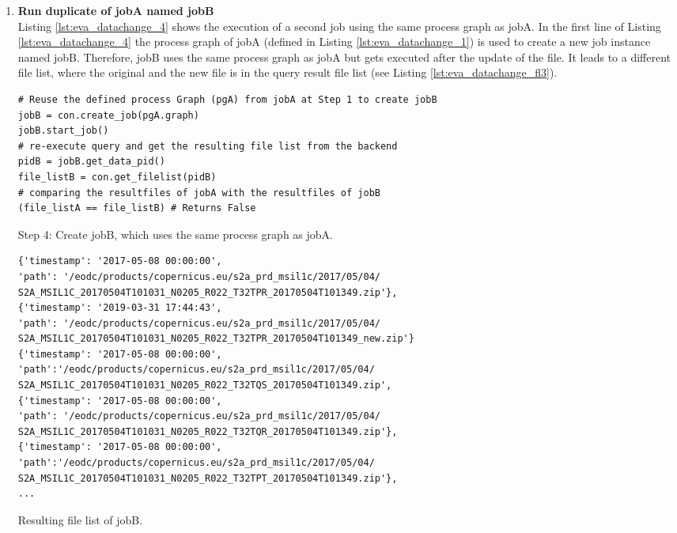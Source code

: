 \documentclass[draft,final]{vutinfth} %
\newenvironment{code}{\captionsetup{type=listing}}{}
\begin{document}
\begin{enumerate}
	\item \textbf{Run duplicate of jobA named jobB} \\
	Listing \ref{lst:eva_datachange_4} shows the execution of a second job using the same process graph as jobA. In the first line of Listing \ref{lst:eva_datachange_4} the process graph of jobA (defined in Listing \ref{lst:eva_datachange_1}) is used to create a new job instance named jobB. Therefore, jobB uses the same process graph as jobA but gets executed after the update of the file. It leads to a different file list, where the original and the new file is in the query result file list (see Listing \ref{lst:eva_datachange_fl3}).
	\begin{code}
		\begin{verbatim}
# Reuse the defined process Graph (pgA) from jobA at Step 1 to create jobB
jobB = con.create_job(pgA.graph)
jobB.start_job()
# re-execute query and get the resulting file list from the backend
pidB = jobB.get_data_pid()
file_listB = con.get_filelist(pidB)
# comparing the resultfiles of jobA with the resultfiles of jobB
(file_listA == file_listB) # Returns False
		\end{verbatim}
		\caption{Step 4: Create jobB, which uses the same process graph as jobA.}
		\label{lst:eva_datachange_4}
	\end{code}
	
	\begin{code}
		\begin{verbatim}
{'timestamp': '2017-05-08 00:00:00', 
'path': '/eodc/products/copernicus.eu/s2a_prd_msil1c/2017/05/04/
S2A_MSIL1C_20170504T101031_N0205_R022_T32TPR_20170504T101349.zip'}, 
{'timestamp': '2019-03-31 17:44:43', 
'path': '/eodc/products/copernicus.eu/s2a_prd_msil1c/2017/05/04/
S2A_MSIL1C_20170504T101031_N0205_R022_T32TPR_20170504T101349_new.zip'}
{'timestamp': '2017-05-08 00:00:00',
'path':'/eodc/products/copernicus.eu/s2a_prd_msil1c/2017/05/04/
S2A_MSIL1C_20170504T101031_N0205_R022_T32TQS_20170504T101349.zip', 
{'timestamp': '2017-05-08 00:00:00', 
'path': '/eodc/products/copernicus.eu/s2a_prd_msil1c/2017/05/04/
S2A_MSIL1C_20170504T101031_N0205_R022_T32TQR_20170504T101349.zip'}, 
{'timestamp': '2017-05-08 00:00:00',
'path':'/eodc/products/copernicus.eu/s2a_prd_msil1c/2017/05/04/
S2A_MSIL1C_20170504T101031_N0205_R022_T32TPT_20170504T101349.zip'},
...
		\end{verbatim}
		\caption{Resulting file list of jobB.}
		\label{lst:eva_datachange_fl3}
	\end{code}
	

\end{enumerate}
\end{document}
